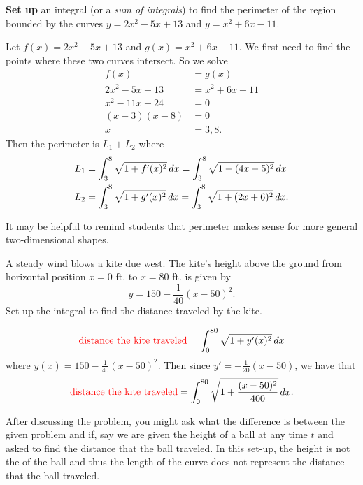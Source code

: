 \documentclass[noinstructornotes]{ximera}
\begin{document}
\begin{problem}
{\bf Set up} an integral (or a {\it sum of integrals}) to find the perimeter of the region bounded by the curves $y=2x^2-5x+13$ and $y=x^2+6x-11$.
	\begin{freeResponse}
	Let $f(x) = 2x^2-5x+13$ and $g(x) = x^2+6x-11$.
	We first need to find the points where these two curves intersect.  
	So we solve
		\begin{align*}
		f(x) &= g(x)  \\
		2x^2-5x+13 &= x^2+6x-11  \\
		x^2-11x+24 &= 0  \\
		(x-3)(x-8) &= 0  \\
		x &= 3,8.
		\end{align*}
	Then the perimeter is $L_1 + L_2$ where
		\begin{align*}
		L_1 &= \int_3^8 \sqrt{1+f'(x)^2} \,d x = \int_3^8 \sqrt{1+(4x-5)^2} \,d x  \\
		L_2 &= \int_3^8 \sqrt{1+g'(x)^2} \,d x = \int_3^8 \sqrt{1+(2x+6)^2} \,d x.
		\end{align*}	
	\end{freeResponse}
	
\end{problem}

\begin{instructorNotes}
It may be helpful to remind students that perimeter makes sense for more general two-dimensional shapes.
\end{instructorNotes}




\begin{problem}
A steady wind blows a kite due west.  
The kite's height above the ground from horizontal position $x=0$ ft. to $x=80$ ft. is given by
	\[
	y = 150 - \frac{1}{40}(x-50)^2.
	\]
Set up the integral to find the distance traveled by the kite.  
	\begin{freeResponse}
		\[
		\text{{\color{red} distance the kite traveled}} = \int_0^{80} \sqrt{1+y'(x)^2} \,d x
		\]
	where $y(x) = 150 - \frac{1}{40}(x-50)^2$.  
	Then since $y' = - \frac{1}{20}(x-50)$, we have that
		\[
		\text{{\color{red} distance the kite traveled}} = \int_0^{80} \sqrt{1 + \frac{(x-50)^2}{400}} \,d x.
		\]
	\end{freeResponse}
		
\end{problem}

\begin{instructorNotes}
After discussing the problem, you might ask what the difference is between the given problem and if, say we are given the height of a ball at any time $t$ and asked to find the distance that the ball traveled.  
In this set-up, the height is not the  of the ball and thus the length of the curve does not represent the distance that the ball traveled.  
\end{instructorNotes}
\end{document}
